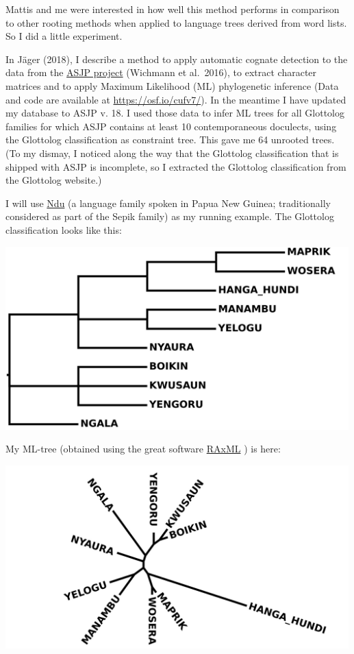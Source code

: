 \documentclass[
  a4paper,
  14pt,
  oneside,
  tablecaptionabove
]{scrbook}
\begin{document}
{Mattis and me were interested in how well this method performs in
comparison to other rooting methods when applied to language trees
derived from word lists. So I did a little experiment.}

{In Jäger (2018), I describe a method to apply automatic cognate
detection to the data from the \href{https://asjp.clld.org/}{ASJP
project} (Wichmann et al.~2016), to extract character matrices and to
apply Maximum Likelihood (ML) phylogenetic inference (Data and code are
available at \url{https://osf.io/cufv7/}). In the meantime I have
updated my database to ASJP v. 18. I used those data to infer ML trees
for all Glottolog families for which ASJP contains at least 10
contemporaneous doculects, using the Glottolog classification as
constraint tree. This gave me 64 unrooted trees. (To my dismay, I
noticed along the way that the Glottolog classification that is shipped
with ASJP is incomplete, so I extracted the Glottolog classification
from the Glottolog website.)}

{I will use
\href{https://glottolog.org/resource/languoid/id/nduu1242}{Ndu} (a
language family spoken in Papua New Guinea; traditionally considered as
part of the Sepik family) as my running example. The Glottolog
classification looks like this:}

{\includegraphics[width=5.21875in,height=2.78125in]{images/Ndu.glot_.jpg}}

{My ML-tree (obtained using the great software
\href{https://cme.h-its.org/exelixis/web/software/raxml/index.html}{RAxML}
) is here:}

{\includegraphics[width=5.21875in,height=2.78125in]{images/Ndu.unrooted.jpg}}
\end{document}
